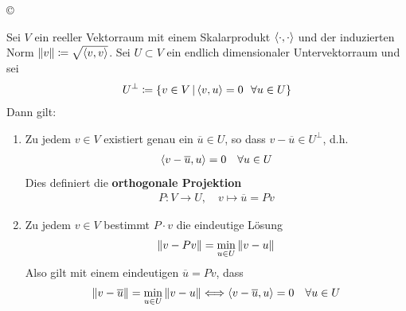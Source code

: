 \begin{image}{\copyright}
\end{image}

\begin{Satze}[Projektionssatz]
   \label{4.3.3}
  Sei $V$ ein reeller Vektorraum mit einem Skalarprodukt $\scp{\cdot}{\cdot}$
  und der induzierten Norm $\nn[v]\coloneqq \sqrt{\scp{v}{v}}$.
  Sei $U\subset V$ ein endlich dimensionaler Untervektorraum und sei
  \begin{gather*}
    U^\bot \coloneqq \left\{ v\in V  \, \middle\vert \, \scp{v}{u} = 0 ~~ \forall u\in U \right\}
  \end{gather*}
  Dann gilt:
  \begin{enumerate}[1)]
  \item Zu jedem $v\in V$ existiert genau ein $\overline{u}\in U$, 
    so dass $v-\overline{u}\in U^\bot$, d.h.
    \begin{gather*}
      \scp{v-\overline{u}}{u} = 0 \quad \forall u \in U
    \end{gather*}
    Dies definiert die \textbf{orthogonale Projektion} 
    \begin{gather*}
      P:V\rightarrow U, \quad v\mapsto \overline{u}= Pv
    \end{gather*}
  \item Zu jedem $v\in V $ bestimmt $P\cdot v$ die eindeutige Lösung
    \begin{gather*}
      \nn[v-Pv]= \min_{u\in U} \nn[v-u]
    \end{gather*}
    Also gilt mit einem eindeutigen $\overline{u}= Pv$, dass 
    \begin{gather}
      \nn[v-\overline{u}] = \min_{u\in U} \nn[v-u] 
      \Longleftrightarrow \scp{v-\overline{u}}{u} = 0 \quad \forall u\in U
      \label{IV.3.3}
    \end{gather}
  \end{enumerate} 	
\end{Satze}

